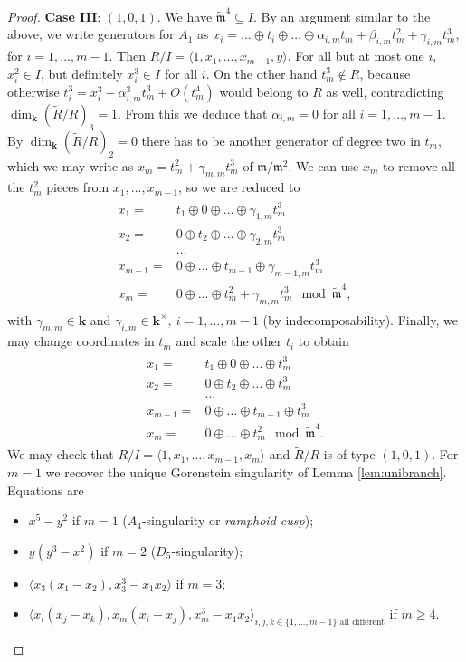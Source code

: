 \documentclass[11pt]{amsart}
\renewcommand{\k}{\mathbf k}
\newcommand{\m}{\mathfrak m}
\newcommand{\tR}{\widetilde{R}}
\newcommand{\tm}{\widetilde{\mathfrak m}}
\theoremstyle{plain}
\theoremstyle{definition}
\begin{document}
\begin{proof}
 
 \textbf{Case III}: $(1,0,1)$. We have $\tm^4\subseteq I$. By an argument similar to the above, we write generators for $A_1$ as $x_i=\ldots\oplus t_i\oplus\ldots \oplus\alpha_{i,m}t_m+\beta_{i,m}t_m^2+\gamma_{i,m}t_m^3$, for $i=1,\ldots,m-1$.
 Then $R/I=\langle 1,x_1,\ldots,x_{m-1},y\rangle$. For all but at most one $i$, $x_i^2\in I$, but definitely $x_i^3\in I$ for all $i$. On the other hand $t_m^3\notin R$, because otherwise $t_i^3=x_i^3-\alpha_{i,m}^3t_m^3+O(t_m^4)$ would belong to $R$ as well, contradicting $\dim_\k(\tR/R)_3=1$. From this we deduce that $\alpha_{i,m}=0$ for all $i=1,\ldots,m-1$. By $\dim_\k(\tR/R)_2=0$ there has to be another generator of degree two in $t_m$, which we may write as $x_m=t_m^2+\gamma_{m,m}t_m^3$ of $\m/\m^2$. We can use $x_m$ to remove all the $t_m^2$ pieces from $x_1,\ldots,x_{m-1}$, so we are reduced to
  \begin{align}\label{coordIII-cs}
 \begin{split}
  x_1= & t_1\oplus0\oplus\ldots\oplus \gamma_{1,m}t_m^3\\
  x_2= & 0\oplus t_2\oplus\ldots\oplus \gamma_{2,m}t_m^3\\
  &\ldots\\
  x_{m-1}= & 0\oplus\ldots\oplus t_{m-1}\oplus \gamma_{m-1,m}t_m^3\\
  x_m= & 0\oplus\ldots\oplus t_m^2+\gamma_{m,m}t_m^3 \mod\tm^4,
  \end{split}
 \end{align}
 with $\gamma_{m,m}\in\k$ and $\gamma_{i,m}\in\k^\times,\ i=1,\ldots,m-1$ (by indecomposability). Finally, we may change coordinates in $t_m$ and scale the other $t_i$ to obtain
 \begin{align}\label{coordIII}
 \begin{split}
  x_1= & t_1\oplus0\oplus\ldots\oplus t_m^3\\
  x_2= & 0\oplus t_2\oplus\ldots\oplus t_m^3\\
  &\ldots\\
  x_{m-1}= & 0\oplus\ldots\oplus t_{m-1}\oplus t_m^3\\
  x_m= & 0\oplus\ldots\oplus t_m^2 \mod\tm^4.
  \end{split}
 \end{align}
 We may check that $R/I=\langle 1,x_1,\ldots,x_{m-1},x_m\rangle$ and $\tR/R$ is of type $(1,0,1)$. For $m=1$ we recover the unique Gorenstein singularity of Lemma \ref{lem:unibranch}. Equations are
 \begin{itemize}
  \item $x^5-y^2$ if $m=1$ ($A_4$-singularity or \emph{ramphoid cusp});
  \item $y(y^3-x^2)$ if $m=2$ ($D_5$-singularity);
  \item $\langle x_3(x_1-x_2),x_3^3-x_1x_2\rangle$ if $m=3$;
  \item $\langle x_i(x_j-x_k), x_m(x_i-x_j),x_m^3-x_1x_2\rangle_{i,j,k\in\{1,\ldots,m-1\}\text{ all different}}$ if $m\geq 4$.
 \end{itemize}
\end{proof}
\end{document}

